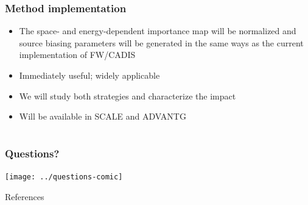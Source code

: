\documentclass[xcolor=x11names,compress]{beamer}
\renewcommand{\(}{\begin{columns}}
\renewcommand{\)}{\end{columns}}
\newcommand{\<}[1]{\begin{column}{#1}}
\renewcommand{\>}{\end{column}}
\begin{document}
\begin{frame}[fragile]
  \frametitle{Method implementation}

  	\begin{itemize}
    \item The space- and energy-dependent importance map will be normalized and 
     source biasing parameters will be generated in the \alert{same ways} as
     the current implementation of FW/CADIS \vspace*{1 em}
	\item Immediately useful; widely applicable \vspace*{1 em}
	\item We will study both strategies and characterize the impact\vspace*{1 em}
	\item Will be available in SCALE \cite{SCALE} and ADVANTG \cite{Pantelias2013}
	\end{itemize}
	
\end{frame}


\section*{}
\begin{frame}[fragile]
  \frametitle{Questions?}
  \begin{center}
  \texttt{[image: ../questions-comic]}  
  \end{center}
  
\end{frame}

\begin{frame}[allowframebreaks]{References}
	
	
\end{frame}
\end{document}
